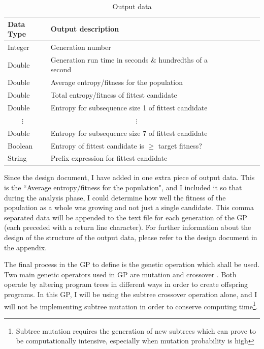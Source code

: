 \documentclass[a4paper,10.5pt]{article}
\begin{document}
\begin{table}[]
\centering
\caption{Output data}
\label{outputparam}
\begin{tabular}{l*{6}{l}r}
Data Type             & Output description\\
\hline
Integer & Generation number\\
Double & Generation run time in seconds \& hundredths of a second \\
Double & Average entropy/fitness for the population\\
Double & Total entropy/fitness of fittest candidate\\
Double & Entropy for subsequence size 1 of fittest candidate\\
\ \ \ \ $\vdots$ & \ \ \ \ \ \ \ \ \ \ \ \ \ \ \ \ \ \ \ \ \ \ \ \ $\vdots$\\
Double & Entropy for subsequence size 7 of fittest candidate\\
Boolean & Entropy of fittest candidate is $\geq$ target fitness?\\
String & Prefix expression for fittest candidate\\
\end{tabular}
\end{table}


Since the design document, I have added in one extra piece of output data. This is the ``Average entropy/fitness for the population", and I included it so that during the analysis phase, I could determine how well the fitness of the population as a whole was growing and not just a single candidate. This comma separated data will be appended to the text file for each generation of the GP (each preceded with a return line character). For further information about the design of the structure of the output data, please refer to the design document in the appendix.

The final process in the GP to define is the genetic operation which shall be used. Two main genetic operators used in GP are mutation and crossover \cite[p.15-17]{introgp}. Both operate by altering program trees in different ways in order to create offspring programs. In this GP, I will be using the subtree crossover operation alone, and I will not be implementing subtree mutation in order to conserve computing time\footnote{Subtree mutation requires the generation of new subtrees which can prove to be computationally intensive, especially when mutation probability is high}.  
\end{document}
